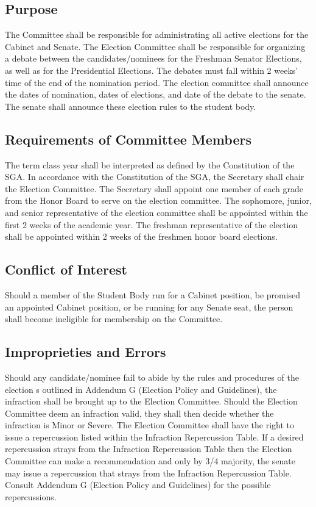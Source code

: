 \documentclass[12pt]{scrreprt}
\begin{document}
\subsection{Purpose}
The Committee shall be responsible for administrating all active elections for 
the Cabinet and Senate. The Election Committee shall be responsible for organizing a debate between the candidates/nominees for the Freshman Senator Elections, as well as for the
Presidential Elections. The debates must fall within 2 weeks’ time of the end of the
nomination period. The election committee shall announce the dates of
nomination, dates of elections, and date of the debate to the senate. The senate
shall announce these election rules to the student body. 

\subsection{Requirements of Committee Members}
The term class year shall be interpreted as defined by the Constitution of the 
SGA. In accordance with the Constitution of the SGA, the Secretary shall chair the Election Committee. The Secretary shall appoint one member of each grade from
the Honor Board to serve on the election committee. The sophomore, junior, and
senior representative of the election committee shall be appointed within the first 2
weeks of the academic year. The freshman representative of the election shall be
appointed within 2 weeks of the freshmen honor board elections.

\subsection{Conflict of Interest}
Should a member of the Student Body run for a Cabinet position, be promised an 
appointed Cabinet position, or be running for any Senate seat, the person 
shall become ineligible for membership on the Committee.

\subsection{Improprieties and Errors}
Should any candidate/nominee fail to abide by the rules and procedures of the
election s outlined in Addendum G (Election Policy and Guidelines), the infraction
shall be brought up to the Election Committee. Should the Election Committee
deem an infraction valid, they shall then decide whether the infraction is Minor or
Severe. The Election Committee shall have the right
to issue a repercussion listed within the Infraction Repercussion Table. If a desired repercussion
strays from the Infraction Repercussion Table then the Election Committee can make a
recommendation and only by 3/4 majority, the senate may issue a repercussion that strays from
the Infraction Repercussion Table. Consult Addendum G (Election Policy and Guidelines) for the
possible repercussions. 
\end{document}
